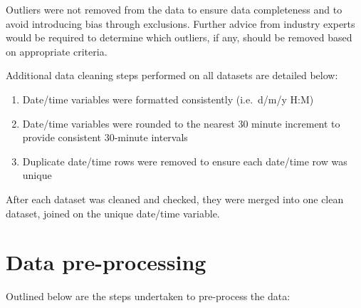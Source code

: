 \documentclass[mstat,12pt]{unswthesis}
\begin{document}
\bigskip

Outliers were not removed from the data to ensure data completeness and to avoid introducing bias through exclusions. Further advice from industry experts would be required to determine which outliers, if any, should be removed based on appropriate criteria.

\bigskip

Additional data cleaning steps performed on all datasets are detailed below:

\begin{enumerate}
\def\labelenumi{\arabic{enumi}.}
\item
  Date/time variables were formatted consistently (i.e.~d/m/y H:M)
\item
  Date/time variables were rounded to the nearest 30 minute increment to provide consistent 30-minute intervals
\item
  Duplicate date/time rows were removed to ensure each date/time row was unique
\end{enumerate}

\bigskip

After each dataset was cleaned and checked, they were merged into one clean dataset, joined on the unique date/time variable.

\section{Data pre-processing}\label{data-pre-processing}

Outlined below are the steps undertaken to pre-process the data:
\end{document}
